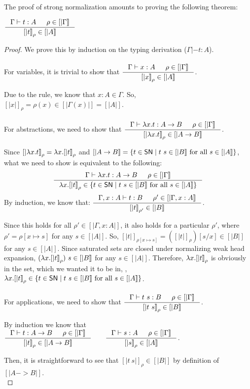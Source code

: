 The proof of strong normalization amounts to proving the following theorem:
\begin{theorem}
$ \inference{\Gamma|- t:A & \rho \in [|\Gamma|]}{[|t|]_\rho \in [|A|]} $
\end{theorem}
\begin{proof}
We prove this by induction on the typing derivation ($\Gamma|- t:A$).
\paragraph{}
For variables, it is trivial to show that
$ \inference{\Gamma |- x:A & \rho \in [|\Gamma|]}{[|x|]_\rho \in [|A|]} $.

Due to the  rule, we know that $x:A \in \Gamma$.
So, $[|x|]_\rho =\rho(x)\in[|\Gamma(x)|] = [|A|]$.

\paragraph{}
For abstractions, we need to show that
$ \inference{\Gamma |- \l x.t : A -> B & \rho \in [|\Gamma|]}
             {[|\l x.t|]_\rho \in [|A -> B|]} $.

Since $[|\lambda x.t|]_\rho = \lambda x.[|t|]_\rho$ and
$[|A -> B|] = \{ t\in \mathsf{SN} \mid t~s\in[|B|]~\text{for all}~s\in[|A|] \}$,
what we need to show is equivalent to the following:
\[ \inference{\Gamma |- \l x.t : A -> B & \rho \in [|\Gamma|]}
             {\l x.[|t|]_\rho \in
                \{ t\in \SN \mid t~s\in[|B|] ~\text{for all}~ s\in[|A|] \} }
\]
By induction, we know that:
$ \inference{\Gamma,x:A |- t : B & \rho' \in [|\Gamma,x:A|]}
             {[|t|]_{\rho'} \in [|B|]} $.

Since this holds for all $\rho' \in [|\Gamma,x:A|]$, it also holds
for a particular $\rho'$, where $\rho' = \rho[x \mapsto s]$ for any $s \in [|A|]$.
So, $[|t|]_{\rho[x\mapsto s]} = ([|t|]_\rho)[s/x]\in[|B|]$ for any $s\in[|A|]$.
Since saturated sets are closed under normalizing weak head expansion,
$(\lambda x.[|t|]_\rho)~s \in[|B|]$ for any $s\in[|A|]$.
Therefore, $\lambda x.[|t|]_\rho$ is obviously in the set,
which we wanted it to be in, \ie,
$\lambda x.[|t|]_\rho\in\{t\in \mathsf{SN} \mid t~s\in[|B|] ~\text{for all}~ s\in[|A|]\}$.

\paragraph{}
For applications, we need to show that
$ \inference{\Gamma |- t~s : B & \rho\in[|\Gamma|]}{[|t~s|]_\rho \in [|B|]} $.

By induction we know that
$
\inference{\Gamma |- t : A -> B & \rho\in[|\Gamma|]}{[|t|]_\rho \in [|A -> B|]}
\qquad
\inference{\Gamma |- s : A & \rho\in[|\Gamma|]}{[|s|]_\rho \in [|A|]}
$.

Then, it is straightforward to see that $[|t~s|]_\rho\in[|B|]$
by definition of $[|A -> B|]$.\\
\end{proof}

